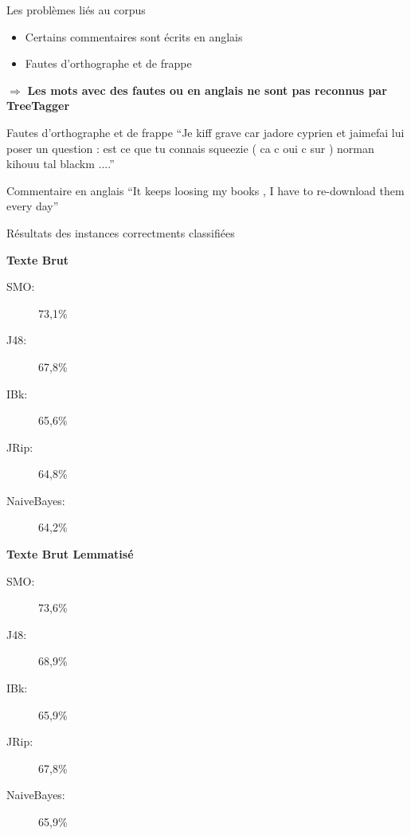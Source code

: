\documentclass{beamer}
\begin{document}
\begin{frame}
	\begin{block}{Les problèmes liés au corpus}
		\begin{itemize}
			\item Certains commentaires sont écrits en anglais
			\item Fautes d'orthographe et de frappe
		\end{itemize}
		
		\vspace{0.5cm}
		
		$\Rightarrow$ \textbf{Les mots avec des fautes ou en anglais ne sont pas reconnus par TreeTagger}
	\end{block}
\end{frame}

\begin{frame}
	\begin{exampleblock}{Fautes d'orthographe et de frappe}
		``Je kiff grave car jadore cyprien et jaimefai lui poser un question : est ce que tu connais squeezie ( ca c oui c sur ) norman kihouu tal blackm ....''\\
		
	\end{exampleblock}
	
	\begin{exampleblock}{Commentaire en anglais}
		``It keeps loosing my books , I have to re-download them every day''
	\end{exampleblock}

\end{frame}

\begin{frame}
	\begin{block}{Résultats des instances correctments classifiées}
	\begin{minipage}{0.4\textwidth}\center
		\textbf{Texte Brut}
		\begin{description}
			\item[SMO: ]73,1\%
			\item[J48: ]67,8\%
			\item[IBk: ]65,6\%
			\item[JRip: ]64,8\%
			\item[NaiveBayes: ]64,2\%
		\end{description}	
		\end{minipage}
		\begin{minipage}{0.4\textwidth}\center
		\textbf{Texte Brut Lemmatisé}
		\begin{description}
			\item[SMO: ]73,6\%
			\item[J48: ]68,9\%
			\item[IBk: ]65,9\%
			\item[JRip: ]67,8\%
			\item[NaiveBayes: ]65,9\%
		\end{description}	
		\end{minipage}
	\end{block}
\end{frame}
\end{document}
